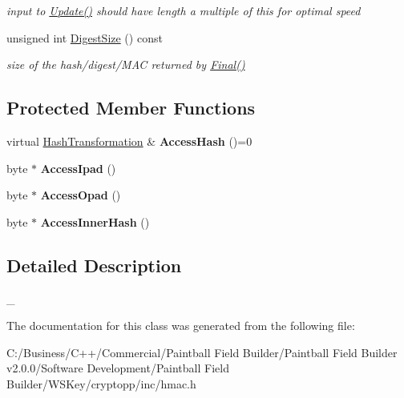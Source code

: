 \begin{DoxyCompactItemize}
\begin{DoxyCompactList}\small\item\em input to \hyperlink{class_h_m_a_c___base_aefb8a1fb43ef8c9390ee89bbb41c83af}{Update()} should have length a multiple of this for optimal speed \item\end{DoxyCompactList}\item 
\hypertarget{class_h_m_a_c___base_a4b3ee793dee4bf86a16fe18326db20e6}{
unsigned int \hyperlink{class_h_m_a_c___base_a4b3ee793dee4bf86a16fe18326db20e6}{DigestSize} () const }
\label{class_h_m_a_c___base_a4b3ee793dee4bf86a16fe18326db20e6}

\begin{DoxyCompactList}\small\item\em size of the hash/digest/MAC returned by \hyperlink{class_hash_transformation_aa0b8c7a110d8968268fd02ec32b9a8e8}{Final()} \item\end{DoxyCompactList}\end{DoxyCompactItemize}
\subsection*{Protected Member Functions}
\begin{DoxyCompactItemize}
\item 
\hypertarget{class_h_m_a_c___base_a2aa91fb1c7b4328edf14af162761318c}{
virtual \hyperlink{class_hash_transformation}{HashTransformation} \& {\bfseries AccessHash} ()=0}
\label{class_h_m_a_c___base_a2aa91fb1c7b4328edf14af162761318c}

\item 
\hypertarget{class_h_m_a_c___base_aa5ec52ba47376b2ed7e707f649551c52}{
byte $\ast$ {\bfseries AccessIpad} ()}
\label{class_h_m_a_c___base_aa5ec52ba47376b2ed7e707f649551c52}

\item 
\hypertarget{class_h_m_a_c___base_a1eb74bfc58d11822a7bfe120d6be5ded}{
byte $\ast$ {\bfseries AccessOpad} ()}
\label{class_h_m_a_c___base_a1eb74bfc58d11822a7bfe120d6be5ded}

\item 
\hypertarget{class_h_m_a_c___base_ae434fa6e09440f0b64118c98fdc5cc2b}{
byte $\ast$ {\bfseries AccessInnerHash} ()}
\label{class_h_m_a_c___base_ae434fa6e09440f0b64118c98fdc5cc2b}

\end{DoxyCompactItemize}


\subsection{Detailed Description}
\_\- 

The documentation for this class was generated from the following file:\begin{DoxyCompactItemize}
\item 
C:/Business/C++/Commercial/Paintball Field Builder/Paintball Field Builder v2.0.0/Software Development/Paintball Field Builder/WSKey/cryptopp/inc/hmac.h\end{DoxyCompactItemize}
